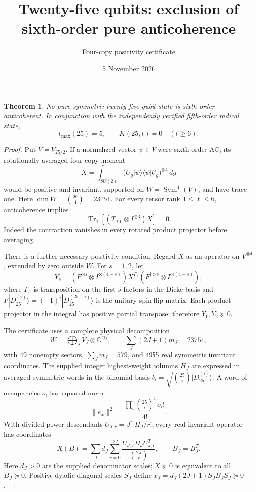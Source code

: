\documentclass[11pt]{article}
\newtheorem{theorem}{Theorem}
\newcommand{\Tr}{\operatorname{Tr}}
\begin{document}
\title{Twenty-five qubits: exclusion of sixth-order pure anticoherence}
\author{Four-copy positivity certificate}\date{5 November 2026}\maketitle
\begin{theorem}
No pure symmetric twenty-five-qubit state is sixth-order anticoherent. In conjunction with the independently verified fifth-order radical state,
\[
\boxed{t_{\max}(25)=5,\qquad K(25,t)=0\quad(t\ge6).}
\]
\end{theorem}
\begin{proof}
Put $V=V_{25/2}$. If a normalized vector $\psi\in V$ were sixth-order AC, its rotationally averaged four-copy moment
\[
 X=\int_{SU(2)}\bigl(U_g|\psi\rangle\langle\psi|U_g^\dagger\bigr)^{\otimes4}\,dg
\]
would be positive and invariant, supported on $W=\operatorname{Sym}^4(V)$, and have trace one. Here $\dim W=\binom{29}{4}=23751$. For every tensor rank $1\le\ell\le6$, anticoherence implies
\[
 \Tr_1[(T_{\ell0}\otimes I^{\otimes3})X]=0.\tag{1}
\]
Indeed the contraction vanishes in every rotated product projector before averaging.

There is a further necessary positivity condition. Regard $X$ as an operator on $V^{\otimes4}$, extended by zero outside $W$. For $s=1,2$, let
\[
 Y_s=(F^{\otimes s}\otimes I^{\otimes(4-s)})X^{\Gamma_s}
 (F^{\dagger\otimes s}\otimes I^{\otimes(4-s)}),
\]
where $\Gamma_s$ is transposition on the first $s$ factors in the Dicke basis and $F|D_{25}^{(i)}\rangle=(-1)^i|D_{25}^{(25-i)}\rangle$ is the unitary spin-flip matrix. Each product projector in the integral has positive partial transpose; therefore $Y_1,Y_2\succeq0$.

The certificate uses a complete physical decomposition
\[
 W=\bigoplus_J V_J\otimes\mathbb C^{m_J},\qquad
 \sum_J(2J+1)m_J=23751,
\]
with 49 nonempty sectors, $\sum_Jm_J=579$, and 4955 real symmetric invariant coordinates. The supplied integer highest-weight columns $H_J$ are expressed in averaged symmetric words in the binomial basis $b_i=\sqrt{\binom{25}{i}}|D_{25}^{(i)}\rangle$. A word of occupancies $o_i$ has squared norm
\[
 \|e_w\|^2=\frac{\prod_i\binom{25}{i}^{o_i}o_i!}{4!}.
\]
With divided-power descendants $U_{J,r}=J_-^rH_J/r!$, every real invariant operator has coordinates
\[
 X(B)=\sum_J d_J\sum_{r=0}^{2J}\frac{U_{J,r}B_JU_{J,r}^T}{\binom{2J}{r}},\qquad B_J=B_J^T.
\]
Here $d_J>0$ are the supplied denominator scales; $X\succeq0$ is equivalent to all $B_J\succeq0$. Positive dyadic diagonal scales $S_J$ define $x_J=d_J(2J+1)S_JB_JS_J\succeq0$.


\end{proof}
\end{document}
